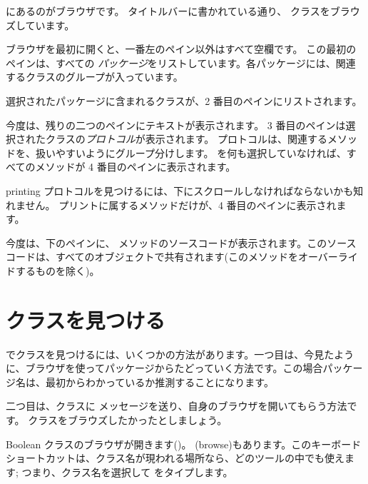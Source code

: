 \documentclass[a4paper,10pt,twoside]{book}
\begin{document}
 にあるのがブラウザです。
タイトルバーに書かれている通り、 クラスをブラウズしています。

ブラウザを最初に開くと、一番左のペイン以外はすべて空欄です。
この最初のペインは、すべての \emph{パッケージ}をリストしています。各パッケージには、関連するクラスのグループが入っています。

選択されたパッケージに含まれるクラスが、2 番目のペインにリストされます。

今度は、残りの二つのペインにテキストが表示されます。
3 番目のペインは選択されたクラスの\emph{プロトコル}が表示されます。
プロトコルは、関連するメソッドを、扱いやすいようにグループ分けします。
を何も選択していなければ、すべてのメソッドが 4 番目のペインに表示されます。

printing プロトコルを見つけるには、下にスクロールしなければならないかも知れません。
プリントに属するメソッドだけが、4 番目のペインに表示されます。

今度は、下のペインに、 メソッドのソースコードが表示されます。このソースコードは、すべてのオブジェクトで共有されます(このメソッドをオーバーライドするものを除く)。

\section{クラスを見つける}

\pharo でクラスを見つけるには、いくつかの方法があります。一つ目は、今見たように、ブラウザを使ってパッケージからたどっていく方法です。この場合パッケージ名は、最初からわかっているか推測することになります。

二つ目は、クラスに メッセージを送り、自身のブラウザを開いてもらう方法です。 クラスをブラウズしたかったとしましょう。

Boolean クラスのブラウザが開きます()。
  (browse)もあります。このキーボードショートカットは、クラス名が現われる場所なら、どのツールの中でも使えます;
つまり、クラス名を選択して  をタイプします。
\end{document}
